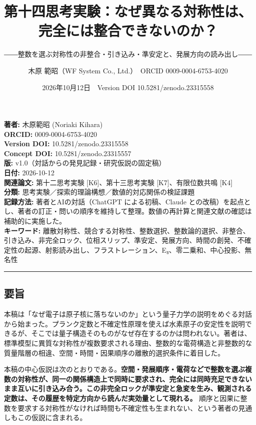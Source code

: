 \documentclass[
  a4paper,
]{ltjsarticle}
\title{第十四思考実験：なぜ異なる対称性は、完全には整合できないのか？}
\subtitle{――整数を選ぶ対称性の非整合・引き込み・準安定と、発展方向の読み出し――}
\author{木原 範昭（WF System Co., Ltd.）　ORCID 0009-0004-6753-4020}
\date{2026年10月12日　Version DOI 10.5281/zenodo.23315558}
\begin{document}
\maketitle

\textbf{著者:} 木原範昭 (Noriaki Kihara)\\
\textbf{ORCID:} 0009-0004-6753-4020\\
\textbf{Version DOI:} 10.5281/zenodo.23315558\\
\textbf{Concept DOI:} 10.5281/zenodo.23315557\\
\textbf{版:} v1.0（対話からの発見記録・研究仮説の固定稿）\\
\textbf{日付:} 2026-10-12\\
\textbf{関連論文:} 第十二思考実験 {[}K6{]}、第十三思考実験
{[}K7{]}、有限位数共鳴 {[}K4{]}\\
\textbf{分類:} 思考実験／探索的理論構想／数値的対応関係の検証課題\\
\textbf{記録方法:} 著者とAIの対話（ChatGPT による初稿、Claude
との改稿）を起点とし、著者の訂正・問いの順序を維持して整理。数値の再計算と関連文献の確認は補助的に実施した。\\
\textbf{キーワード:}
離散対称性、競合する対称性、整数選択、整数論的選択、非整合、引き込み、非完全ロック、位相スリップ、準安定、発展方向、時間の創発、不確定性の起源、射影読み出し、フラストレーション、E₈、零二乗和、中心投影、無名性

\begin{center}\rule{0.5\linewidth}{0.5pt}\end{center}

\subsection{要旨}\label{ux8981ux65e8}

本稿は「なぜ電子は原子核に落ちないのか」という量子力学の説明をめぐる対話から始まった。プランク定数と不確定性原理を使えば水素原子の安定性を説明できるが、そこでは量子構造そのものがなぜ存在するのかは問われない。著者は、標準模型に異質な対称性が複数要求される理由、整数的な電荷構造と非整数的な質量階層の相違、空間・時間・因果順序の離散的選択条件に着目した。

本稿の中心仮説は次のとおりである。\textbf{空間・発展順序・電荷などで整数を選ぶ複数の対称性が、同一の関係構造上で同時に要求され、完全には同時充足できないまま互いに引き込み合う。この非完全ロックが準安定と急変を生み、観測される定数は、その履歴を特定方向から読んだ実効量として現れる。}
順序と因果に整数を要求する対称性がなければ時間も不確定性も生まれない、という著者の見通しもこの仮説に含まれる。
\end{document}
